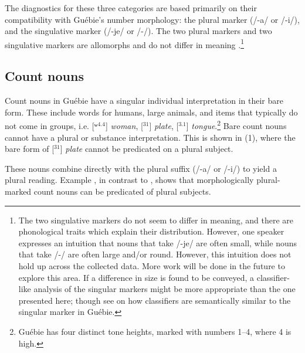 \documentclass[output=paper,colorlinks,citecolor=brown]{langscibook}
\begin{document}
The diagnostics for these three categories are based primarily on their compatibility with Guébie's number morphology: the plural marker (/-a/ or /-i/), and the singulative marker (/-je/ or /-/). The two plural markers and two singulative markers are allomorphs and do not differ in meaning \citep{Sande2017}.\footnote{The two singulative markers do not seem to differ in meaning, and there are phonological traits which explain their distribution. However, one speaker expresses an intuition that nouns that take /-je/ are often small, while nouns that take /-/ are often large and/or round. However, this intuition does not hold up across the collected data. More work will be done in the future to explore this area. If a difference in size is found to be conveyed, a classifier-like analysis of the singular markers might be more appropriate than the one presented here; though see  on how classifiers are semantically similar to the singular marker in Guébie.}

\subsection{Count nouns}\label{sec:sande:2.1}

Count nouns in Guébie have a singular individual interpretation in their bare form. These include words for humans, large animals, and items that typically do not come in groups, i.e. [ʷ$^{4.4}$] \textit{woman}, [$^{31}$] \textit{plate}, [$^{3.1}$] \textit{tongue}.\footnote{Guébie has four distinct tone heights, marked with numbers 1--4, where 4 is high.} Bare count nouns cannot have a plural or substance interpretation. This is shown in (1), where the bare form of [$^{31}$] \textit{plate} cannot be predicated on a plural subject.

\z

These nouns combine directly with the plural suffix (/-a/ or /-i/) to yield a plural reading. Example , in contrast to , shows that morphologically plural-marked count nouns can be predicated of plural subjects.
\end{document}
